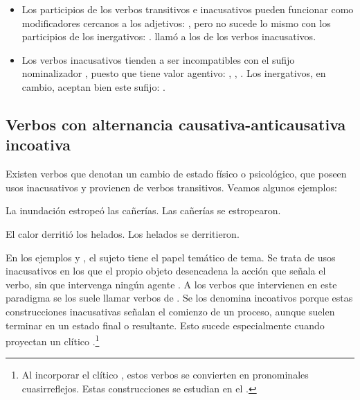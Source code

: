 \begin{itemize}
  \item Los participios de los verbos transitivos e inacusativos pueden
        funcionar como modificadores cercanos a los adjetivos: , pero no sucede lo mismo con los participios de los inergativos:
        . \textcite{bello2002} llamó
         a los de los verbos
        inacusativos.
  \item Los verbos inacusativos tienden a ser incompatibles con el sufijo
        nominalizador , puesto que tiene valor agentivo:
        , ,
        . Los inergativos, en cambio, aceptan bien
        este sufijo: .
\end{itemize}

\subsection{Verbos con alternancia causativa-anticausativa incoativa}\label{sec:07-alternancia}

Existen verbos que denotan un cambio de estado físico o psicológico, que poseen
usos inacusativos y provienen de verbos transitivos. Veamos algunos ejemplos:

\begin{exe}
  \ex
    \begin{xlist}
      \ex La inundación estropeó las cañerías.
      \ex\label{ex:07-estropearon} Las cañerías se estropearon.
    \end{xlist}
  \ex
    \begin{xlist}
      \ex El calor derritió los helados.
      \ex\label{ex:07-derritieron} Los helados se derritieron.
    \end{xlist}
\end{exe}

En los ejemplos  y , el
sujeto tiene el papel temático de tema. Se trata de usos inacusativos en los que
el propio objeto desencadena la acción que señala el verbo, sin que intervenga
ningún agente \parencite{rodriguezramalle2005}. A los verbos que intervienen en
este paradigma se los suele llamar verbos de . Se los denomina incoativos porque estas
construcciones inacusativas señalan el comienzo de un proceso, aunque suelen
terminar en un estado final o resultante. Esto sucede especialmente cuando
proyectan un clítico .\footnote{Al incorporar el clítico ,
estos verbos se convierten en pronominales cuasirreflejos. Estas construcciones
se estudian en el .}


